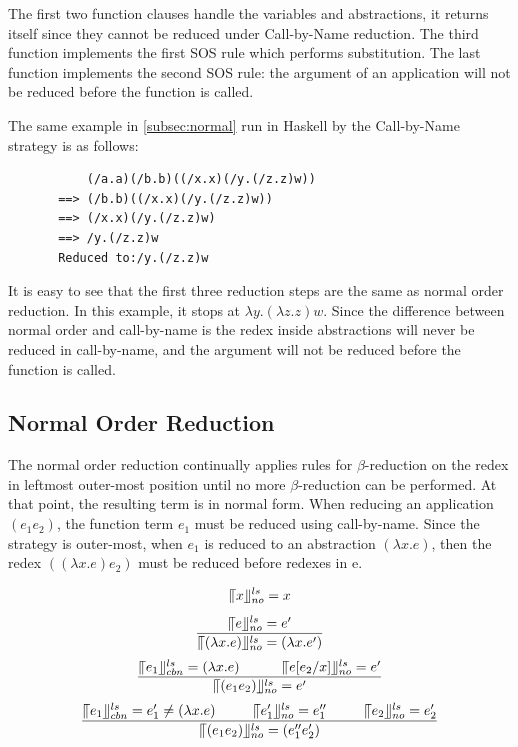 The first two function clauses handle the variables and abstractions, it returns itself since they cannot be reduced under Call-by-Name reduction. The third function implements the first SOS rule which performs substitution. The last function implements the second SOS rule: the argument of an application will not be reduced before the function is called. 

\begin{exmp}
\normalfont The same example in \ref{subsec:normal} run in Haskell by the Call-by-Name strategy is as follows:
\end{exmp}


\begin{verbatim}
           (/a.a)(/b.b)((/x.x)(/y.(/z.z)w))
       ==> (/b.b)((/x.x)(/y.(/z.z)w))
       ==> (/x.x)(/y.(/z.z)w)
       ==> /y.(/z.z)w
       Reduced to:/y.(/z.z)w
\end{verbatim}

It is easy to see that the first three reduction steps are the same as normal order reduction. In this example, it stops at $\lambda y.(\lambda z.z)w$. Since the difference between normal order and call-by-name is the redex inside abstractions will never be reduced in call-by-name, and the argument will not be reduced before the function is called. 

\subsection{Normal Order Reduction}{\label{subsec:normal}}

The normal order reduction continually applies rules for $\beta$-reduction on the redex in leftmost outer-most position until no more $\beta$-reduction can be performed. At that point, the resulting term is in normal form. When reducing an application $(e_1e_2)$, the function term $e_1$ must be reduced using call-by-name. Since the strategy is outer-most, when $e_1$ is reduced to an abstraction $(\lambda x.e)$, then the redex $((\lambda x.e)e_2)$ must be reduced before redexes in e.

\begin{equation*}
\llceil x \rrfloor ^{ls} _{no} = x
\end{equation*}
\begin{equation*}
\frac{\llceil e \rrfloor ^{ls} _{no} = e'}{\llceil (\lambda x.e) \rrfloor ^{ls} _{no} = (\lambda x.e')}
\end{equation*}
\begin{equation*}
\frac{\llceil e_1 \rrfloor ^{ls} _{cbn} = (\lambda x.e)\ \ \ \ \ \ \ \ \ \llceil e[e_2/x] \rrfloor ^{ls} _{no} = e'}{\llceil (e_1e_2) \rrfloor ^{ls} _{no} = e'}
\end{equation*}
\begin{equation*}
\frac{\llceil e_1 \rrfloor ^{ls} _{cbn} = e'_1\neq (\lambda x.e)\ \ \ \ \ \ \ \ \llceil e'_1 \rrfloor ^{ls} _{no} = e''_1\ \ \ \ \ \ \ \ \llceil e_2 \rrfloor ^{ls} _{no} = e'_2}{\llceil (e_1e_2) \rrfloor ^{ls} _{no} = (e''_1e'_2)}
\end{equation*}

